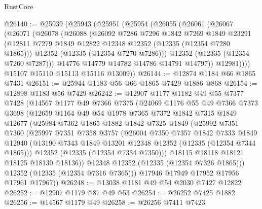 \begin{lexlean}{RustCore}
\begin{coremodule}
@26140 := @25939
    (@25943
      (@25951
        (@25954
          (@26055
            (@26061
              (@26067
                (@26071
                  (@26078
                    (@26088
                      (@26092
                        @7286
                        @7296
                        @1842
                        @7269
                        @1849
                        @23291
                        (@12811 @7279 @1849 @12822 @12348 @12352 (@12335 (@12354 @7280 @1865)))
                        @12352
                        (@12335 (@12354 @7270 @7286)))
                      @12352
                      (@12335 (@12354 @7260 @7287)))
                    @14776
                    @14779
                    @14782
                    @14786
                    @14791
                    @14797))
                @12981))))
        @15107
        @15110
        @15113
        @15116
        @13009))
@26144 := @12874 @1184 @66 @1865 @7431
@26151 := @25944 @1183 @56 @66 @1865 @7429 @1886 @868
@26154 := @12898 @1183 @56 @7429
@26242 := @12907
    @1177
    @1182
    @49
    @55
    @7377
    @7428
    (@14567
      @1177
      @49
      @7366
      @7375
      (@24069
        @1176
        @55
        @49
        @7366
        @7373
        @3698
        (@12659
          @1164
          @49
          @54
          @1978
          @7365
          @7372
          @1842
          @7315
          @1849
          @12677
          (@25984
            @7362
            @1865
            @1882
            @1842
            @7325
            @1849
            (@25992
              @7351
              @7360
              (@25997
                @7351
                @7358
                @3757
                (@26004
                  @7350
                  @7357
                  @1842
                  @7333
                  @1849
                  @12940
                  (@13190 @7343 @1849 @13201 @12348 @12352 (@12335 (@12354 @7344 @1865)))
                  @12352
                  (@12335 (@12354 @7334 @7350)))
                @18115
                @18118
                @18121
                @18125
                @18130
                @18136))
            @12348
            @12352
            (@12335 (@12354 @7326 @1865)))
          @12352
          (@12335 (@12354 @7316 @7365)))
        @17946
        @17949
        @17952
        @17956
        @17961
        @17967))
@26248 := @13038 @1181 @49 @54 @2030 @7427 @12822
@26252 := @12907 @1179 @87 @49 @53
@26254 := @26252 @7425 @1882
@26256 := @14567 @1179 @49
@26258 := @26256 @7411 @7423

\end{coremodule}
\end{lexlean}
